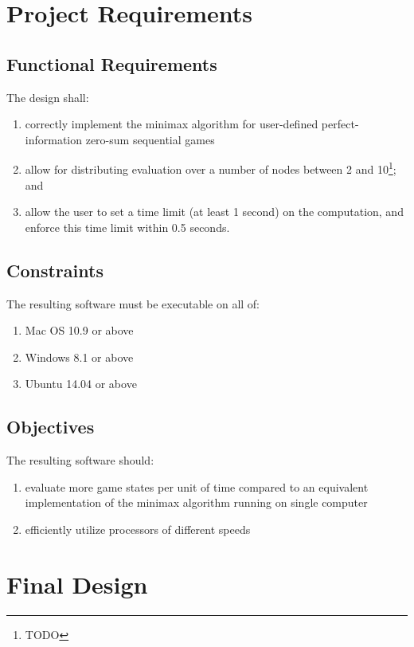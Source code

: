 \documentclass[pdftex,12pt,a4paper]{article}
\begin{document}
%
%
\section{Project Requirements}\label{sec:requirements}

\subsection{Functional Requirements}

The design shall:
\begin{enumerate}
\item correctly implement the minimax algorithm for user-defined perfect-information zero-sum sequential games
\item allow for distributing evaluation over a number of nodes between 2 and 10\footnote{TODO}; and
\item allow the user to set a time limit (at least 1 second) on the computation, and enforce this time limit within 0.5 seconds.
\end{enumerate}

\subsection{Constraints}

The resulting software must be executable on all of:
\begin{enumerate}
\item Mac OS 10.9 or above
\item Windows 8.1 or above
\item Ubuntu 14.04 or above
\end{enumerate}

\subsection{Objectives}\label{sec:objectives}

The resulting software should:
\begin{enumerate}
\item evaluate more game states per unit of time compared to an equivalent implementation of the minimax algorithm running on single computer
\item\label{itm:obj-efficiency} efficiently utilize processors of different speeds
\end{enumerate}


\section{Final Design}
\end{document}
